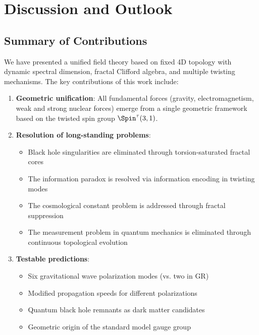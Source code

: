 \section{Discussion and Outlook}
\label{sec:outlook}

\subsection{Summary of Contributions}

We have presented a unified field theory based on fixed 4D topology with dynamic spectral dimension, fractal Clifford algebra, and multiple twisting mechanisms. The key contributions of this work include:

\begin{enumerate}
    \item \textbf{Geometric unification}: All fundamental forces (gravity, electromagnetism, weak and strong nuclear forces) emerge from a single geometric framework based on the twisted spin group $\Spin^\tau(3,1)$.
    
    \item \textbf{Resolution of long-standing problems}:
    \begin{itemize}
        \item Black hole singularities are eliminated through torsion-saturated fractal cores
        \item The information paradox is resolved via information encoding in twisting modes
        \item The cosmological constant problem is addressed through fractal suppression
        \item The measurement problem in quantum mechanics is eliminated through continuous topological evolution
    \end{itemize}
    
    \item \textbf{Testable predictions}:
    \begin{itemize}
        \item Six gravitational wave polarization modes (vs. two in GR)
        \item Modified propagation speeds for different polarizations
        \item Quantum black hole remnants as dark matter candidates
        \item Geometric origin of the standard model gauge group
    \end{itemize}
\end{enumerate}

